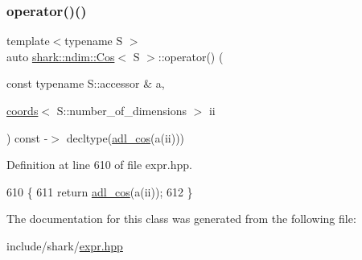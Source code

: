 \subsubsection{\texorpdfstring{operator()()}{operator()()}}
{\footnotesize\ttfamily template$<$typename S $>$ \\
auto \hyperlink{classshark_1_1ndim_1_1_cos}{shark\+::ndim\+::\+Cos}$<$ S $>$\+::operator() (\begin{DoxyParamCaption}\item[{const typename S\+::accessor \&}]{a,  }\item[{\hyperlink{structshark_1_1ndim_1_1coords}{coords}$<$ S\+::number\+\_\+of\+\_\+dimensions $>$}]{ii }\end{DoxyParamCaption}) const -\/$>$ decltype(\hyperlink{namespaceshark_ae60244cfc7c72df7cbd33ab9fb90ff7e}{adl\+\_\+cos}(a(ii))) \hspace{0.3cm}{\ttfamily [inline]}}



Definition at line 610 of file expr.\+hpp.


\begin{DoxyCode}
610                                                                                                            
                        \{
611                 \textcolor{keywordflow}{return} \hyperlink{namespaceshark_ae60244cfc7c72df7cbd33ab9fb90ff7e}{adl\_cos}(a(ii));
612             \}
\end{DoxyCode}


The documentation for this class was generated from the following file\+:\begin{DoxyCompactItemize}
\item 
include/shark/\hyperlink{expr_8hpp}{expr.\+hpp}\end{DoxyCompactItemize}
